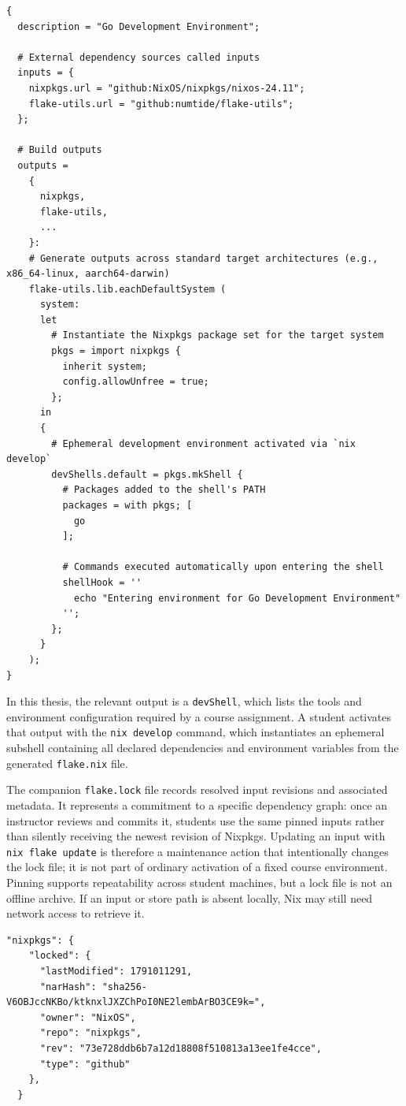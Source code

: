\begin{lstlisting}[caption={Example of a flake file}, label={lst:example-flake-nix}]
{
  description = "Go Development Environment";

  # External dependency sources called inputs
  inputs = {
    nixpkgs.url = "github:NixOS/nixpkgs/nixos-24.11";
    flake-utils.url = "github:numtide/flake-utils";
  };

  # Build outputs
  outputs =
    {
      nixpkgs,
      flake-utils,
      ...
    }:
    # Generate outputs across standard target architectures (e.g., x86_64-linux, aarch64-darwin)
    flake-utils.lib.eachDefaultSystem (
      system:
      let
        # Instantiate the Nixpkgs package set for the target system
        pkgs = import nixpkgs {
          inherit system;
          config.allowUnfree = true;
        };
      in
      {
        # Ephemeral development environment activated via `nix develop`
        devShells.default = pkgs.mkShell {
          # Packages added to the shell's PATH
          packages = with pkgs; [
            go
          ];

          # Commands executed automatically upon entering the shell
          shellHook = ''
            echo "Entering environment for Go Development Environment"
          '';
        };
      }
    );
}
\end{lstlisting}

In this thesis, the relevant output is a \texttt{devShell}, which lists the tools
and environment configuration required by a course assignment. A student
activates that output with the \texttt{nix develop} command, which instantiates
an ephemeral subshell containing all declared dependencies and environment
variables from the generated \texttt{flake.nix} file.

The companion \texttt{flake.lock} file records resolved input revisions and
associated metadata. It represents a commitment to a specific dependency graph:
once an instructor reviews and commits it, students use the same pinned inputs rather
than silently receiving the newest revision of Nixpkgs. Updating an input with
\texttt{nix flake update} is therefore a maintenance action that intentionally changes
the lock file; it is not part of ordinary activation of a fixed course
environment. Pinning supports repeatability across student machines, but a lock
file is not an offline archive. If an input or store path is absent locally, Nix
may still need network access to retrieve it.

\begin{lstlisting}[caption={\texttt{flake.lock} \texttt{nixpkgs} Attributes}, label={lst:flake-lock-nixpkgs-attributes}]
  "nixpkgs": {
    "locked": {
      "lastModified": 1791011291,
      "narHash": "sha256-V6OBJccNKBo/ktknxlJXZChPoI0NE2lembArBO3CE9k=",
      "owner": "NixOS",
      "repo": "nixpkgs",
      "rev": "73e728ddb6b7a12d18808f510813a13ee1fe4cce",
      "type": "github"
    },
  }
\end{lstlisting}

